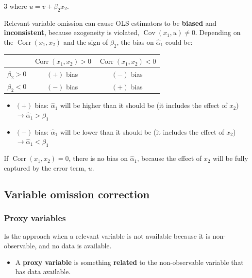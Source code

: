\documentclass[10pt, a4paper, landscape]{article}
\DeclareMathOperator{\Cov}{Cov}
\DeclareMathOperator{\Corr}{Corr}
\begin{document}
\begin{multicols}{3}
\quad where \( u = v + \beta_{2} x_{2} \).

Relevant variable omission can cause OLS estimators to be \textbf{biased} and \textbf{inconsistent}, because exogeneity is violated, \( \Cov(x_{1}, u) \neq 0 \). Depending on the \( \Corr(x_{1}, x_{2}) \) and the sign of \( \beta_{2} \), the bias on \( \hat{\alpha}_{1} \) could be:

\begin{center}
	\begin{tabular}{ c | c c }
		                    & \( \Corr(x_{1}, x_{2}) > 0 \) & \( \Corr(x_{1}, x_{2}) < 0 \) \\ \hline
		\( \beta_{2} > 0 \) & \( (+) \) bias                & \( (-) \) bias                \\
		\( \beta_{2} < 0 \) & \( (-) \) bias                & \( (+) \) bias
	\end{tabular}
\end{center}

\begin{itemize}[leftmargin=*]
	\item \( (+) \) bias: \( \hat{\alpha}_{1} \) will be higher than it should be (it includes the effect of \( x_{2} \)) \( \rightarrow \hat{\alpha}_{1} > \beta_{1} \)
	\item \( (-) \) bias: \( \hat{\alpha}_{1} \) will be lower than it should be (it includes the effect of \( x_{2} \)) \( \rightarrow \hat{\alpha}_{1} < \beta_{1} \)
\end{itemize}

If \( \Corr(x_{1}, x_{2}) = 0 \), there is no bias on \( \hat{\alpha}_{1} \), because the effect of \( x_{2} \) will be fully captured by the error term, \( u \).

\columnbreak

\subsection*{Variable omission correction}

\subsubsection*{Proxy variables}

Is the approach when a relevant variable is not available because it is non-observable, and no data is available.

\begin{itemize}[leftmargin=*]
	\item A \textbf{proxy variable} is something \textbf{related} to the non-observable variable that has data available.
\end{itemize}


\end{multicols}
\end{document}
